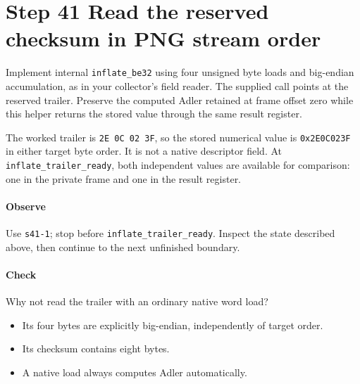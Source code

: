 \section{Step 41 Read the reserved checksum in PNG stream order}\label{png-inflate-s41}
Implement internal \texttt{inflate\_be32} using four unsigned byte loads and big-endian accumulation, as in your collector's field reader. The supplied call points at the reserved trailer. Preserve the computed Adler retained at frame offset zero while this helper returns the stored value through the same result register.

The worked trailer is \texttt{2E 0C 02 3F}, so the stored numerical value is \texttt{0x2E0C023F} in either target byte order. It is not a native descriptor field. At \texttt{inflate\_trailer\_ready}, both independent values are available for comparison: one in the private frame and one in the result register.

\paragraph{Observe} Use \texttt{s41-1}; stop before \texttt{inflate\_trailer\_ready}. Inspect the state described above, then continue to the next unfinished boundary.

\paragraph{Check} Why not read the trailer with an ordinary native word load?
\begin{itemize}
  \item[A.] Its four bytes are explicitly big-endian, independently of target order.
  \item[B.] Its checksum contains eight bytes.
  \item[C.] A native load always computes Adler automatically.
\end{itemize}

